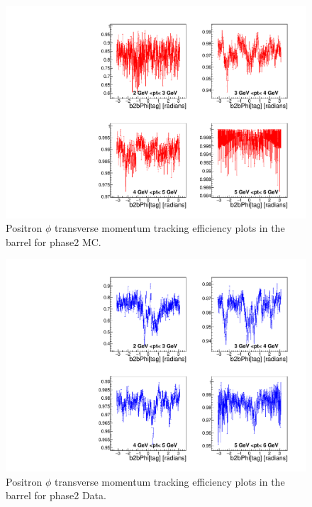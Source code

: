 \documentclass[a4paper,11pt,twosided,final,german,openbib,pdftex,listof=totoc,bibliography=totoc]{scrbook}
\begin{document}
\begin{appendix}
\begin{figure}[!htbp]
	\centering
	\includegraphics[width=\textwidth]{Plots/master/xPtMPhiepBarrel_MC}
	\caption[Transverse Momentum $\phi$ Positron Barrel Efficiency Phase2 MC]{Positron $\phi$ transverse momentum tracking efficiency plots in the barrel for phase2 MC.}
	\label{plt:PtMPhiepBarrel_MC}
\end{figure}


\begin{figure}[!htbp]
	\centering
	\includegraphics[width=\textwidth]{Plots/master/xPtMPhiepBarrel_Data}
	\caption[Transverse Momentum $\phi$ Positron Barrel Efficiency Phase2 Data]{Positron $\phi$ transverse  momentum tracking efficiency plots in the barrel for phase2 Data.}
	\label{plt:PtMPhiepBarrel_Data}
\end{figure}



\end{appendix}
\end{document}
